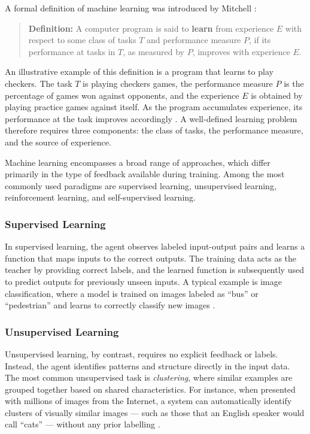 A formal definition of machine learning was introduced by Mitchell
\cite{mitchell1997}:

\begin{quote}
\textbf{Definition:} A computer program is said to \textbf{learn} from
experience $E$ with respect to some class of tasks $T$ and performance
measure $P$, if its performance at tasks in $T$, as measured by $P$,
improves with experience $E$.
\end{quote}

An illustrative example of this definition is a program
  that learns to play checkers.
The task $T$ is playing checkers games, the performance measure $P$ is the
percentage of games won against opponents, and the experience $E$ is obtained
by playing practice games against itself. As the program accumulates experience,
its performance at the task improves accordingly \cite{mitchell1997}. A
well-defined learning problem therefore requires three components: the class of
tasks, the performance measure, and the source of experience.

Machine learning encompasses a broad range of approaches, which differ
primarily in the type of feedback available during training. Among the
most commonly used paradigms are supervised learning, unsupervised
learning, reinforcement learning, and self-supervised learning.

\subsubsection*{Supervised Learning}

In supervised learning, the agent observes labeled input-output pairs
and learns a function that maps inputs to the correct outputs. The training
data acts as the teacher by providing correct labels, and the learned function
is subsequently used to predict outputs for previously unseen inputs.
A typical example is image classification, where a model is trained on images
labeled as ``bus'' or ``pedestrian'' and learns to correctly classify new
images \cite{russell2022}.

\subsubsection*{Unsupervised Learning}

Unsupervised learning, by contrast, requires no explicit feedback or
labels. Instead, the agent identifies patterns and structure directly in the
input data. The most common unsupervised task is \textit{clustering}, where similar
examples are grouped together based on shared characteristics. For instance,
when presented with millions of images from the Internet, a system can
automatically identify clusters of visually similar images --- such as those
that an English speaker would call ``cats'' --- without any prior labelling
\cite{russell2022}.

